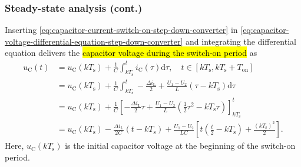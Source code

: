 \begin{frame}
    \frametitle{Steady-state analysis (cont.)}
    Inserting \eqref{eq:capacitor-current-switch-on-step-down-converter} in \eqref{eq:capacitor-voltage-differential-equation-step-down-converter} and integrating the differential equation delivers the \hl{capacitor voltage during the switch-on period} as
    \begin{equation}
        \begin{split}
            u_\mathrm{C}(t) &= u_\mathrm{C}(k T_\mathrm{s}) + \frac{1}{C}\int_{k T_\mathrm{s}}^t i_\mathrm{C}(\tau) \mathrm{d}\tau , \quad t\in [k T_\mathrm{s}, k T_\mathrm{s} + T_\mathrm{on}]\\
            &= u_\mathrm{C}(k T_\mathrm{s}) + \frac{1}{C}\int_{k T_\mathrm{s}}^t -\frac{\Delta i_\mathrm{L}}{2} + \frac{U_1-U_2}{L} (\tau -k T_\mathrm{s}) \mathrm{d}\tau\\
            &=u_\mathrm{C}(k T_\mathrm{s}) + \frac{1}{C} \left[-\frac{\Delta i_\mathrm{L}}{2}\tau + \frac{U_1-U_2}{L} (\frac{1}{2}\tau^2 -k T_\mathrm{s}\tau)\right]_{k T_\mathrm{s}}^t\\
            &=u_\mathrm{C}(k T_\mathrm{s}) - \frac{\Delta i_\mathrm{L}}{2 C}(t- kT_\mathrm{s}) + \frac{U_1-U_2}{LC} \left[t(\frac{t}{2}-kT_\mathrm{s}) + \frac{(kT_\mathrm{s})^2}{2}\right].
        \end{split}
        \label{eq:capacitor-voltage-switch-on-step-down-converter}
    \end{equation}
    Here, $u_\mathrm{C}(k T_\mathrm{s})$ is the initial capacitor voltage at the beginning of the switch-on period.
\end{frame}

